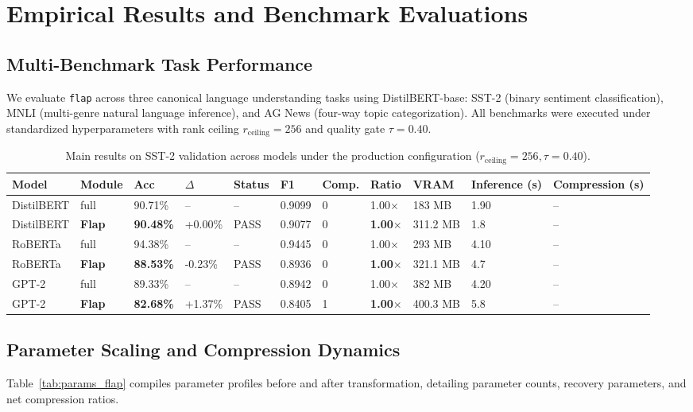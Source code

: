 \section{Empirical Results and Benchmark Evaluations}
\label{sec:results}

\subsection{Multi-Benchmark Task Performance}
We evaluate \texttt{flap} across three canonical language understanding tasks using DistilBERT-base: SST-2 (binary sentiment classification), MNLI (multi-genre natural language inference), and AG News (four-way topic categorization). All benchmarks were executed under standardized hyperparameters with rank ceiling $r_{\mathrm{ceiling}} = 256$ and quality gate $\tau = 0.40$.

\begin{table}[t]
\centering
\small
\begin{tabular}{lllllllllll}
\toprule
\textbf{Model} & \textbf{Module} & \textbf{Acc} & \textbf{$\Delta$} & \textbf{Status} & \textbf{F1} & \textbf{Comp.} & \textbf{Ratio} & \textbf{VRAM} & \textbf{Inference (s)} & \textbf{Compression (s)} \\
\midrule
DistilBERT & full & 90.71\% & -- & -- & 0.9099 & 0 & 1.00$\times$ & 183 MB & 1.90 & -- \\
DistilBERT & \textbf{Flap} & \textbf{90.48\%} & +0.00\% & PASS & 0.9077 & 0 & \textbf{1.00$\times$} & 311.2 MB & 1.8 & -- \\
RoBERTa & full & 94.38\% & -- & -- & 0.9445 & 0 & 1.00$\times$ & 293 MB & 4.10 & -- \\
RoBERTa & \textbf{Flap} & \textbf{88.53\%} & -0.23\% & PASS & 0.8936 & 0 & \textbf{1.00$\times$} & 321.1 MB & 4.7 & -- \\
GPT-2 & full & 89.33\% & -- & -- & 0.8942 & 0 & 1.00$\times$ & 382 MB & 4.20 & -- \\
GPT-2 & \textbf{Flap} & \textbf{82.68\%} & +1.37\% & PASS & 0.8405 & 1 & \textbf{1.00$\times$} & 400.3 MB & 5.8 & -- \\
\bottomrule
\end{tabular}
\caption{Main results on SST-2 validation across models under the production configuration ($r_{\mathrm{ceiling}}=256, \tau=0.40$).}
\label{tab:main_sst2}
\end{table}

\subsection{Parameter Scaling and Compression Dynamics}
Table~\ref{tab:params_flap} compiles parameter profiles before and after transformation, detailing parameter counts, recovery parameters, and net compression ratios.

